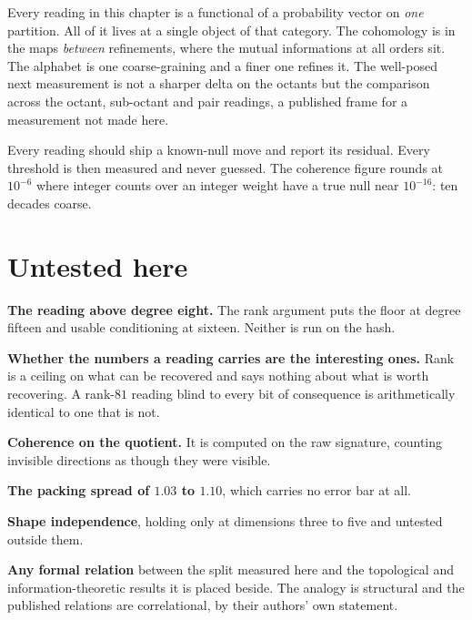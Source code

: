 Every reading in this chapter is a functional of a probability vector on \emph{one} partition. All of it lives at a single object of that category. The cohomology is in the maps \emph{between} refinements, where the mutual informations at all orders sit. The alphabet is one coarse-graining and a finer one refines it. The well-posed next measurement is not a sharper delta on the octants but the comparison across the octant, sub-octant and pair readings, a published frame for a measurement not made here.

Every reading should ship a known-null move and report its residual. Every threshold is then measured and never guessed. The coherence figure rounds at \(10^{-6}\) where integer counts over an integer weight have a true null near \(10^{-16}\): ten decades coarse.

\section{Untested here}

\textbf{The reading above degree eight.} The rank argument puts the floor at degree fifteen and usable conditioning at sixteen. Neither is run on the hash.

\textbf{Whether the numbers a reading carries are the interesting ones.} Rank is a ceiling on what can be recovered and says nothing about what is worth recovering. A rank-\(81\) reading blind to every bit of consequence is arithmetically identical to one that is not.

\textbf{Coherence on the quotient.} It is computed on the raw signature, counting invisible directions as though they were visible.

\textbf{The packing spread of \(1.03\) to \(1.10\)}, which carries no error bar at all.

\textbf{Shape independence}, holding only at dimensions three to five and untested outside them.

\textbf{Any formal relation} between the split measured here and the topological and information-theoretic results it is placed beside. The analogy is structural and the published relations are correlational, by their authors' own statement.
